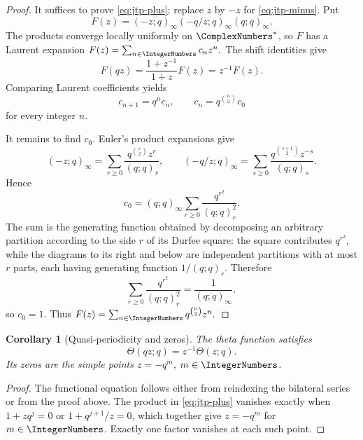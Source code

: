 \documentclass[11pt,a4paper,oneside,openany]{book}
\newtheorem{corollary}[corollary]{Corollary}
\theoremstyle{definition}
\theoremstyle{remark}
\begin{document}
\begin{proof}
It suffices to prove \eqref{eq:jtp-plus}; replace $z$ by $-z$ for \eqref{eq:jtp-minus}.  Put
\[
 F(z)=(-z;q)_\infty(-q/z;q)_\infty(q;q)_\infty.
\]
The products converge locally uniformly on $\ComplexNumbers^*$, so $F$ has a Laurent expansion
\(
 F(z)=\sum_{n\in\IntegerNumbers}c_nz^n.
\)
The shift identities give
\[
 F(qz)=\frac{1+z^{-1}}{1+z}F(z)=z^{-1}F(z).
\]
Comparing Laurent coefficients yields
\[
 c_{n+1}=q^nc_n,
 \qquad
 c_n=q^{\binom n2}c_0
\]
for every integer $n$.

It remains to find $c_0$.  Euler's product expansions give
\[
 (-z;q)_\infty=\sum_{r\ge0}\frac{q^{\binom r2}z^r}{(q;q)_r},
 \qquad
 (-q/z;q)_\infty=\sum_{s\ge0}\frac{q^{\binom{s+1}{2}}z^{-s}}{(q;q)_s}.
\]
Hence
\[
 c_0=(q;q)_\infty\sum_{r\ge0}\frac{q^{r^2}}{(q;q)_r^2}.
\]
The sum is the generating function obtained by decomposing an arbitrary partition according to the side $r$ of its Durfee square: the square contributes $q^{r^2}$, while the diagrams to its right and below are independent partitions with at most $r$ parts, each having generating function $1/(q;q)_r$.  Therefore
\[
 \sum_{r\ge0}\frac{q^{r^2}}{(q;q)_r^2}
 =\frac1{(q;q)_\infty},
\]
so $c_0=1$.  Thus
\(
 F(z)=\sum_{n\in\IntegerNumbers}q^{\binom n2}z^n.
\)
\end{proof}

\begin{corollary}[Quasi-periodicity and zeros]\label{cor:theta-quasi}
The theta function satisfies
\[
 \Theta(qz;q)=z^{-1}\Theta(z;q).
\]
Its zeros are the simple points $z=-q^m$, $m\in\IntegerNumbers$.
\end{corollary}

\begin{proof}
The functional equation follows either from reindexing the bilateral series or from the proof above.  The product in \eqref{eq:jtp-plus} vanishes exactly when $1+zq^j=0$ or $1+q^{j+1}/z=0$, which together give $z=-q^m$ for $m\in\IntegerNumbers$.  Exactly one factor vanishes at each such point.
\end{proof}

\end{document}
